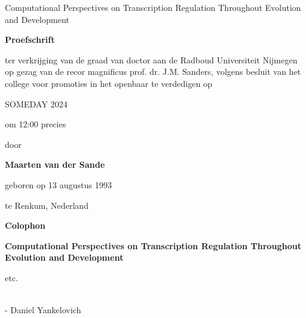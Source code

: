 \vspace*{\fill}
\begin{center}


{\huge Computational Perspectives on Transcription Regulation Throughout Evolution and Development}

\vspace{1cm}

\textbf{{\large Proefschrift}}

\vspace{1cm}

ter verkrijging van de graad van doctor aan de Radboud Universiteit Nijmegen op gezag van de recor magnificus prof. dr. J.M. Sanders, volgens besluit van het college voor promoties in het openbaar te verdedigen op

\vspace{1cm}

SOMEDAY 2024

\vspace{1cm}

om 12:00 precies

\vspace{1cm}

door

\vspace{1cm}

\textbf{Maarten van der Sande}

geboren op 13 augustus 1993

te Renkum, Nederland

\end{center}
\vspace*{\fill}

\newpage

\noindent
\textbf{{\large Colophon}}

\noindent
\textbf{Computational Perspectives on Transcription Regulation Throughout Evolution and Development}

\noindent
etc.

\newpage

\vspace*{\fill}

{\raggedleft\vfill\itshape{}\\}
\hspace*{\fill} - Daniel Yankelovich

